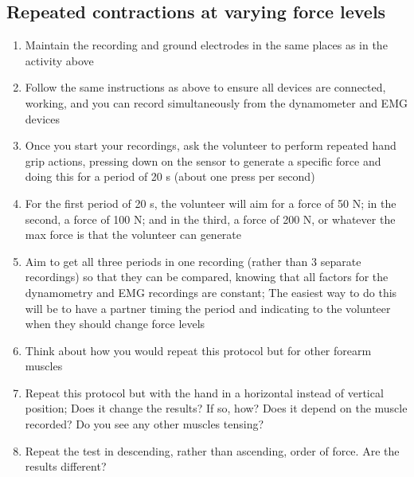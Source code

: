 \documentclass{article}
\begin{document}
\subsection{Repeated contractions at varying force levels}

\begin{enumerate}
\item Maintain the recording and ground electrodes in the same places as in the activity above
\item Follow the same instructions as above to ensure all devices are connected, working, and you can record simultaneously from the dynamometer and EMG devices
\item Once you start your recordings, ask the volunteer to perform repeated hand grip actions, pressing down on the sensor to generate a specific force and doing this for a period of 20 s (about one press per second)
\item For the first period of 20 s, the volunteer will aim for a force of 50 N; in the second, a force of 100 N; and in the third, a force of 200 N, or whatever the max force is that the volunteer can generate
\item Aim to get all three periods in one recording (rather than 3 separate recordings) so that they can be compared, knowing that all factors for the dynamometry and EMG recordings are constant; The easiest way to do this will be to have a partner timing the period and indicating to the volunteer when they should change force levels
\item Think about how you would repeat this protocol but for other forearm muscles
\item Repeat this protocol but with the hand in a horizontal instead of vertical position; Does it change the results? If so, how? Does it depend on the muscle recorded? Do you see any other muscles tensing?
\item Repeat the test in descending, rather than ascending, order of force. Are the results different?
\end{enumerate}

\clearpage

\end{document}
